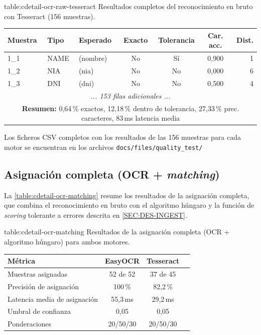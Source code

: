 \begin{table}[Resultados OCR en bruto — Tesseract]%
            {table:cdetail-ocr-raw-tesseract}%
            {Resultados completos del reconocimiento en bruto con
             Tesseract (156 muestras).}
  \small
  \renewcommand{\arraystretch}{1.2}
  \begin{tabular}{l l l c c c r}
    \hline
    \textbf{Muestra} & \textbf{Tipo} & \textbf{Esperado} & \textbf{Exacto} &
    \textbf{Tolerancia} & \textbf{Car. acc.} & \textbf{Dist.} \\
    \hline
    1\_1  & NAME & (nombre) & No & Sí & 0{,}900 & 1 \\
    1\_2  & NIA  & (nia)    & No & No & 0{,}000 & 6 \\
    1\_3  & DNI  & (dni)    & No & No & 0{,}500 & 4 \\
    \multicolumn{7}{c}{\textit{... 153 filas adicionales ...}} \\
    \hline
    \multicolumn{7}{c}{\textbf{Resumen:} 0{,}64\,\% exactos,
                        12{,}18\,\% dentro de tolerancia,
                        27{,}33\,\% prec. caracteres,
                        83\,ms latencia media} \\
    \hline
  \end{tabular}
\end{table}

Los ficheros CSV completos con los resultados de las 156 muestras para
cada motor se encuentran en los archivos
\texttt{docs/files/quality\_test/}

\subsection{Asignación completa (OCR + \textit{matching})}

La \cref{table:cdetail-ocr-matching} resume los resultados de la
asignación completa, que combina el reconocimiento en bruto con el
algoritmo húngaro y la función de \textit{scoring} tolerante a errores
descrita en \cref{SEC:DES-INGEST}.

\begin{table}[Resultados de asignación completa]%
            {table:cdetail-ocr-matching}%
            {Resultados de la asignación completa (OCR + algoritmo
             húngaro) para ambos motores.}
  \small
  \renewcommand{\arraystretch}{1.3}
  \begin{tabular}{l c c c}
    \hline
    \textbf{Métrica} & \textbf{EasyOCR} & \textbf{Tesseract} \\
    \hline
    Muestras asignadas            & 52 de 52    & 37 de 45 \\
    Precisión de asignación       & 100\,\%     & 82{,}2\,\% \\
    Latencia media de asignación  & 55{,}3\,ms  & 29{,}2\,ms \\
    Umbral de confianza           & 0{,}05      & 0{,}05 \\
    Ponderaciones                 & 20/50/30    & 20/50/30 \\
    \hline
  \end{tabular}
\end{table}

